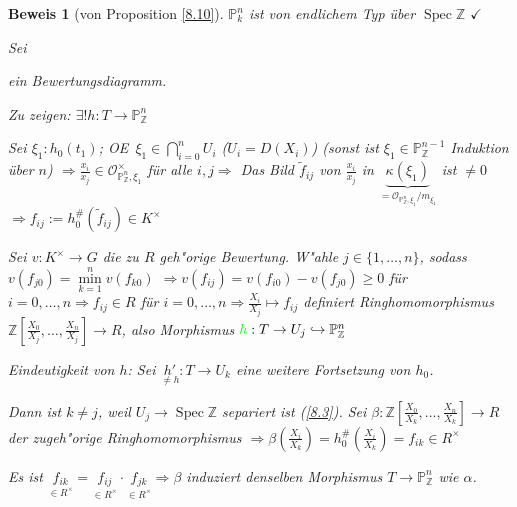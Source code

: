 \documentclass[paper = A4, fontsize=12pt, numbers=noendperiod, chapterprefix=true]{scrbook}
\theoremstyle{break}
\theoremstyle{nonumberbreak}
\newtheorem{bew}{Beweis}
\theoremstyle{nonumberplain}
\DeclareMathOperator{\Spec}{Spec}
\newcommand{\Z}{\mathbb{Z}}
\newcommand{\IP}{\mathbb{P}}%
\newcommand{\calO}{\mathcal{O}}
\newcommand{\X}{\times}
\renewcommand{\OE}{O\!\!E~}
\begin{document}
\begin{bew}[von Proposition \ref{8.10}]
$\IP_k^n$ ist von endlichem Typ \"uber $\Spec \Z$ $\checkmark$

Sei  ein Bewertungsdiagramm.

\emph{Zu zeigen}: $\exists! h: T \to \IP_\Z^n$

Sei $\xi_1: h_0(t_1)$; \OE $\xi_1 \in \bigcap\limits_{i=0}^n U_i$ ($U_i = D(X_i)$) (sonst ist $\xi_1 \in \IP_\Z^{n-1}$ Induktion \"uber $n$) $\Rightarrow \frac{x_i}{x_j} \in \calO_{\IP_\Z^n, \xi_1}^\X$ f\"ur alle $i,j \Rightarrow$ Das Bild $\tilde f_{ij}$ von $\frac{x_i}{x_j}$ in $\underbrace{\kappa(\xi_1)}_{= \calO_{\IP_\Z^n,\xi_1}/m_{\xi_1}}$ ist $\ne 0$ $\Rightarrow f_{ij} := h_0^\#(\tilde f_{ij}) \in K^\X$

Sei $v: K^\X \to G$ die zu $R$ geh"orige Bewertung. W"ahle $j \in \{1,\ldots ,n\}$, sodass $v(f_{j0}) = \min\limits_{k=1}^n v(f_{k0})$ $\Rightarrow v(f_{ij}) = v(f_{i0}) - v(f_{j0}) \ge 0$ f\"ur $i= 0,\ldots ,n \Rightarrow f_{ij} \in R$ f\"ur $i= 0,\ldots ,n \Rightarrow \frac{X_i}{X_j} \mapsto f_{ij}$ definiert Ringhomomorphismus $\Z[\frac{X_0}{X_j},\ldots ,\frac{X_n}{X_j}] \to R$, also Morphismus $\textcolor{safe2}{h}: T \to U_j \hookrightarrow \IP_\Z^n$

\emph{Eindeutigkeit von $h$}: Sei $\underset{\ne h}{h'}: T \to U_k$ eine weitere Fortsetzung von $h_0$.

Dann ist $k \ne j$, weil $U_j \to \Spec \Z$ separiert ist (\ref{8.3}). Sei $\beta: \Z[\frac{X_0}{X_k},\ldots ,\frac{X_n}{X_k}] \to R$ der zugeh"orige Ringhomomorphismus $\Rightarrow \beta(\frac{X_i}{X_k}) = h_0^\#(\frac{X_i}{X_k}) = f_{ik} \in R^{\times}$

Es ist $\underset{\in R^\X}{f_{ik}} = \underset{\in R^\X}{f_{ij}} \cdot \underset{\in R^\X}{f_{jk}} \Rightarrow \beta$ induziert denselben Morphismus $T \to \IP_\Z^n$ wie $\alpha$.
\end{bew}


\end{document}
